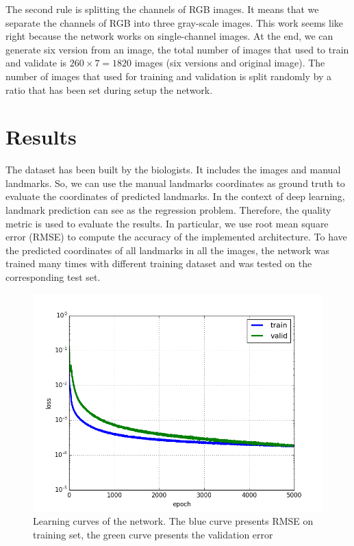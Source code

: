 \documentclass[conference]{IEEEtran}
\begin{document}
The second rule is splitting the channels of RGB images. It means that we separate the channels of RGB into three gray-scale images. This work seems like right because the network works on single-channel images. At the end, we can generate six version from an image, the total number of images that used to train and validate is $260 \times 7 = 1820$ images (six versions and original image). The number of images that used for training and validation is split randomly by a ratio that has been set during setup the network.
\section{Results}
The dataset has been built by the biologists. It includes the images and manual landmarks. So, we can use the manual landmarks coordinates as ground truth to evaluate the coordinates of predicted landmarks. In the context of deep learning, landmark prediction can see as the regression problem. Therefore, the quality metric is used to evaluate the results. In particular, we use root mean square error (RMSE) to compute the accuracy of the implemented architecture. To have the predicted coordinates of all landmarks in all the images, the network was trained many times with different training dataset and was tested on the corresponding test set.

\begin{figure}[htbp]
	\centerline{\includegraphics[scale=0.35]{images/loss_v16}}
	\caption{Learning curves of the network. The blue curve presents RMSE on training set, the green curve presents the validation error}
	\label{figloss}
\end{figure}
\end{document}

